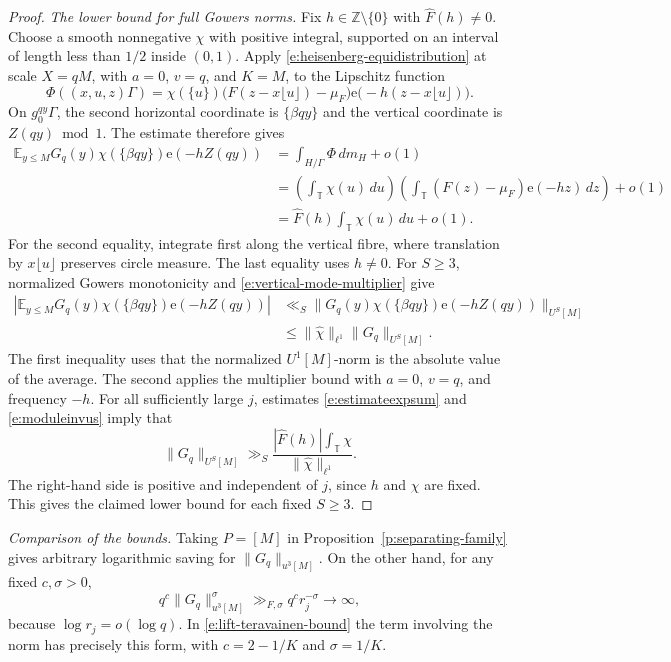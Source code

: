 \documentclass[12pt]{amsart}
\newcommand{\1}{\mathbf 1}
\newcommand{\e}{\mathrm e}
\theoremstyle{definition}
\begin{document}
\begin{proof}
\noindent\emph{The lower bound for full Gowers norms.}
Fix \(h\in\mathbb Z\setminus\{0\}\) with \(\widehat F(h)\ne0\).
Choose a smooth nonnegative \(\chi\) with positive integral,
supported on an interval of length less than \(1/2\) inside \((0,1)\). Apply \eqref{e:heisenberg-equidistribution} at scale \(X=qM\),
with \(a=0\), \(v=q\), and \(K=M\), to the Lipschitz function
\[
 \Phi((x,u,z)\Gamma)
 =\chi(\{u\})\bigl(F(z-x\lfloor u\rfloor)-\mu_F\bigr)
   \e\bigl(-h(z-x\lfloor u\rfloor)\bigr).
\]
On \(g_0^{qy}\Gamma\), the second horizontal coordinate is
\(\{\beta qy\}\) and the vertical coordinate is \(Z(qy)\bmod 1\).
The estimate therefore gives
\begin{align}\label{e:estimateexpsum}
 \mathbb E_{y\leq M}G_q(y)\chi(\{\beta qy\})\e(-hZ(qy))
 &=\int_{H/\Gamma}\Phi\,dm_H+o(1)\\
 &=\left(\int_{\mathbb T}\chi(u)\,du\right)
   \left(\int_{\mathbb T}(F(z)-\mu_F)\e(-hz)\,dz\right)+o(1)\nonumber\\
 &=\widehat F(h)\int_{\mathbb T}\chi(u)\,du+o(1)\nonumber.
\end{align}
For the second equality, integrate first along the vertical fibre,
where translation by \(x\lfloor u\rfloor\) preserves circle measure.
The last equality uses \(h\ne0\). 
For \(S\geq3\), normalized Gowers monotonicity and
\eqref{e:vertical-mode-multiplier} give
\begin{align}\label{e:moduleinvus}
 \left|\mathbb E_{y\leq M}
   G_q(y)\chi(\{\beta qy\})\e(-hZ(qy))\right|
 &\ll_S
 \bigl\|G_q(y)\chi(\{\beta qy\})\e(-hZ(qy))\bigr\|_{U^S[M]}\\
 &\leq \|\widehat\chi\|_{\ell^1}\|G_q\|_{U^S[M]}\nonumber.
\end{align}
The first inequality uses that the normalized \(U^1[M]\)-norm
is the absolute value of the average. The second applies the
multiplier bound with \(a=0\), \(v=q\), and frequency \(-h\).
For all sufficiently large \(j\), estimates \eqref{e:estimateexpsum} and \eqref{e:moduleinvus} imply that 
\[
 \|G_q\|_{U^S[M]}
 \gg_S
 \frac{|\widehat F(h)|\int_{\mathbb T}\chi}
      {\|\widehat\chi\|_{\ell^1}}.
\]
The right-hand side is positive and independent of \(j\), since
\(h\) and \(\chi\) are fixed. This gives the claimed lower bound
for each fixed \(S\geq3\).
\end{proof}

\medskip
\noindent\emph{Comparison of the bounds.}
Taking \(P=[M]\) in Proposition~\ref{p:separating-family}
gives arbitrary logarithmic saving for \(\|G_q\|_{u^3[M]}\).
On the other hand, for any fixed \(c,\sigma>0\),
\[
 q^c\|G_q\|_{u^3[M]}^\sigma
 \gg_{F,\sigma} q^c r_j^{-\sigma}\longrightarrow\infty,
\]
because \(\log r_j=o(\log q)\). In
\eqref{e:lift-teravainen-bound} the term involving the norm
has precisely this form, with \(c=2-1/K\) and \(\sigma=1/K\).
\end{document}
